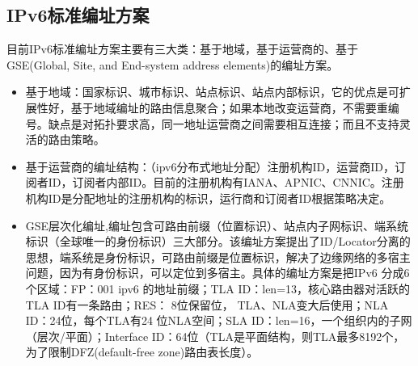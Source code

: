 \subsection{IPv6标准编址方案}
目前IPv6标准编址方案主要有三大类：基于地域，基于运营商的、基于GSE(Global, Site, and End-system address elements)的编址方案。
\begin{itemize}
\item 基于地域：国家标识、城市标识、站点标识、站点内部标识，它的优点是可扩展性好，基于地域编址的路由信息聚合；如果本地改变运营商，不需要重编号。缺点是对拓扑要求高，同一地址运营商之间需要相互连接；而且不支持灵活的路由策略。
\item 基于运营商的编址结构：（ipv6分布式地址分配）注册机构ID，运营商ID，订阅者ID，订阅者内部ID。目前的注册机构有IANA、APNIC、CNNIC。注册机构ID是分配地址的注册机构的标识，运行商和订阅者ID根据策略决定。
\item GSE层次化编址,编址包含可路由前缀（位置标识）、站点内子网标识、端系统标识（全球唯一的身份标识）三大部分。该编址方案提出了ID/Locator分离的思想，端系统是身份标识，可路由前缀是位置标识，解决了边缘网络的多宿主问题，因为有身份标识，可以定位到多宿主。具体的编址方案是把IPv6 分成6个区域：FP：001 ipv6 的地址前缀；TLA ID：len=13，核心路由器对活跃的TLA ID有一条路由；RES： 8位保留位， TLA、NLA变大后使用；NLA ID：24位，每个TLA有24 位NLA空间；SLA ID：len=16，一个组织内的子网（层次/平面）；Interface ID：64位（TLA是平面结构，则TLA最多8192个，为了限制DFZ(default-free zone)路由表长度）。
\end{itemize}

